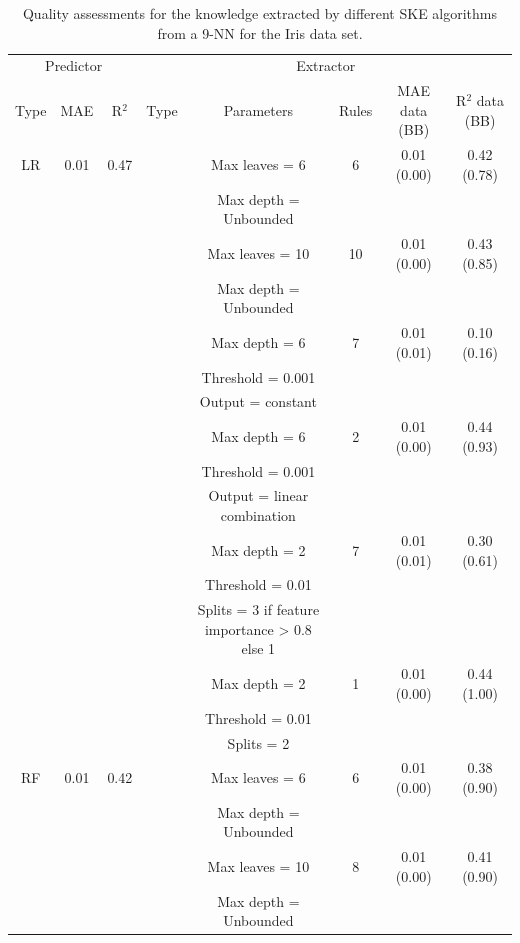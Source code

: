 \documentclass[sigconf]{acmart}
\begin{document}
\begin{table}[t]\centering
	\caption{Quality assessments for the knowledge extracted by different SKE algorithms from a 9-NN for the Iris data set.}\label{tab:experiments}
	\begin{tabular}{cccccccc}
		\toprule
		\multicolumn{3}{c}{Predictor} &\multicolumn{5}{c}{Extractor} \\
		\cmidrule(lr){1-3}
		\cmidrule(lr){4-8}
		Type & MAE & R$^2$ & Type & Parameters & Rules & MAE data (BB) & R$^2$ data (BB) \\
		\midrule
		LR & 0.01 & 0.47 & \cart{} & Max leaves = 6 & 6 & 0.01 (0.00) & 0.42 (0.78) \\
		& & & & Max depth = Unbounded & & & \\
		\cmidrule(lr){4-8}
		& & & \cart{} & Max leaves = 10 & 10 & 0.01 (0.00) & 0.43 (0.85) \\
		& & & & Max depth = Unbounded & & & \\
		\cmidrule(lr){4-8}
		& & & \creepy{} & Max depth = 6 & 7 & 0.01 (0.01) & 0.10 (0.16) \\
		& & & & Threshold = 0.001 & & & \\
		& & & & Output = constant & & & \\
		\cmidrule(lr){4-8}
		& & & \creepy{} & Max depth = 6 & 2 & 0.01 (0.00) & 0.44 (0.93) \\
		& & & & Threshold = 0.001 & & & \\
		& & & & Output = linear combination & & & \\
		\cmidrule(lr){4-8}
		& & & \gridex{} & Max depth = 2 & 7 & 0.01 (0.01) & 0.30 (0.61) \\
		& & & & Threshold = 0.01 & & & \\
		& & & & Splits = 3 if feature importance > 0.8 else 1 & & & \\
		\cmidrule(lr){4-8}
		& & & \gridrex{} & Max depth = 2 & 1 & 0.01 (0.00) & 0.44 (1.00) \\
		& & & & Threshold = 0.01 & & & \\
		& & & & Splits = 2 & & & \\
		\midrule
		RF & 0.01 & 0.42 & \cart{} & Max leaves = 6 & 6 & 0.01 (0.00) & 0.38 (0.90) \\
		& & & & Max depth = Unbounded & & & \\
		\cmidrule(lr){4-8}
		& & & \cart{} & Max leaves = 10 & 8 & 0.01 (0.00) & 0.41 (0.90) \\
		& & & & Max depth = Unbounded & & & \\
		\cmidrule(lr){4-8}

\end{tabular}
\end{table}
\end{document}
